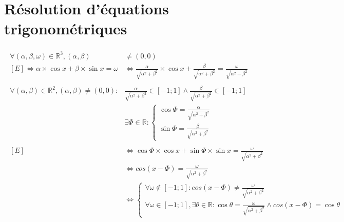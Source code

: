 \documentclass[a4paper]{article}
\begin{document}
	\section{Résolution d'équations trigonométriques}
	\begin{gather*}
		\begin{split}
			\forall \left( \alpha,\beta,\omega \right) \in\mathbb{R}^3, \left( \alpha,\beta \right) &\neq \left( 0,0 \right) \\
			\left[E\right]\Leftrightarrow\alpha\times\cos{x} + \beta\times\sin{x} = \omega &\Leftrightarrow \frac{\alpha}{\sqrt{\alpha^2+\beta^2}}\times\cos{x} + \frac{\beta}{\sqrt{\alpha^2+\beta^2}} = \frac{\omega}{\sqrt{\alpha^2+\beta^2}}\\
			\\
			\forall\left(\alpha,\beta\right)\in\mathbb{R}^2, \left(\alpha, \beta\right)\neq\left(0,0\right):&\frac{\alpha}{\sqrt{\alpha^2+\beta^2}}\in\left[-1; 1\right]\wedge\frac{\beta}{\sqrt{\alpha^2+\beta^2}}\in\left[-1; 1\right]\\
			&\exists\varPhi\in\mathbb{R}:
			\begin{cases}
				\cos{\varPhi} = \frac{\alpha}{\sqrt{\alpha^2+\beta^2}}\\
				\sin{\varPhi} = \frac{\beta}{\sqrt{\alpha^2+\beta^2}}
			\end{cases}\\
			\\
			\left[E\right]&\Leftrightarrow\cos{\varPhi}\times\cos{x} + \sin{\varPhi}\times\sin{x} = \frac{\omega}{\sqrt{\alpha^2+\beta^2}}\\
			&\Leftrightarrow cos\left(x-\varPhi\right) = \frac{\omega}{\sqrt{\alpha^2+\beta^2}}\\
			&\Leftrightarrow
			\begin{cases}
				\forall\omega\notin\left[-1; 1\right]: cos\left(x-\varPhi\right) \neq \frac{\omega}{\sqrt{\alpha^2+\beta^2}}\\
				\forall\omega\in\left[-1; 1\right], \exists\theta\in\mathbb{R}: \cos{\theta} = \frac{\omega}{\sqrt{\alpha^2+\beta^2}}\wedge cos\left(x-\varPhi\right) = \cos{\theta}
			\end{cases}
		\end{split}
	\end{gather*}
\end{document}
